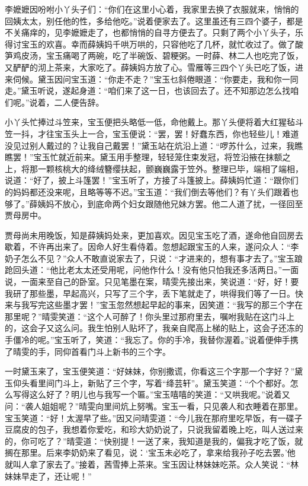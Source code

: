 \documentclass[12pt,oneside]{book}
\begin{document}
李嬷嬷因吩咐小丫头子们：“你们在这里小心着，我家里去换了衣服就来，悄悄的回姨太太，别任他的性，多给他吃。”说着便家去了。这里虽还有三四个婆子，都是不关痛痒的，见李嬷嬷走了，也都悄悄的自寻方便去了。只剩了两个小丫头子，乐得讨宝玉的欢喜。幸而薛姨妈千哄万哄的，只容他吃了几杯，就忙收过了。做了酸笋鸡皮汤，宝玉痛喝了两碗，吃了半碗饭、碧粳粥。一时薛、林二人也吃完了饭，又酽酽的沏上茶来，大家吃了。薛姨妈方放了心。雪雁等三四个丫头已吃了饭，进来伺候。黛玉因问宝玉道：“你走不走？”宝玉乜斜倦眼道：“你要走，我和你一同走。”黛玉听说，遂起身道：“咱们来了这一日，也该回去了。还不知那边怎么找咱们呢。”说着，二人便告辞。

小丫头忙捧过斗笠来，宝玉便把头略低一低，命他戴上。那丫头便将着大红猩毡斗笠一抖，才往宝玉头上一合，宝玉便说：“罢，罢！好蠢东西，你也轻些儿！难道没见过别人戴过的？让我自己戴罢！”黛玉站在炕沿上道：“啰苏什么，过来，我瞧瞧罢！”宝玉忙就近前来。黛玉用手整理，轻轻笼住束发冠，将笠沿掖在抹额之上，将那一颗核桃大的绛绒簪缨扶起，颤巍巍露于笠外。整理已毕，端相了端相，说道：“好了，披上斗篷罢！”宝玉听了，方接了斗篷披上。薛姨妈忙道：“跟你们的妈妈都还没来呢，且略等等不迟。”宝玉道：“我们倒去等他们？有丫头们跟着也够了。”薛姨妈不放心，到底命两个妇女跟随他兄妹方罢。他二人道了扰，一径回至贾母房中。

贾母尚未用晚饭，知是薛姨妈处来，更加喜欢。因见宝玉吃了酒，遂命他自回房去歇着，不许再出来了。因命人好生看侍着。忽想起跟宝玉的人来，遂问众人：“李奶子怎么不见？”众人不敢直说家去了，只说：“才进来的，想有事才去了。”宝玉踉跄回头道：“他比老太太还受用呢，问他作什么！没有他只怕我还多活两日。”一面说，一面来至自己的卧室。只见笔墨在案，晴雯先接出来，笑说道：“好，好！要我研了那些墨，早起高兴，只写了三个字，丢下笔就走了，哄得我们等了一日。快来与我写完这些墨才罢！”宝玉忽然想起早起的事来，因笑道：“我写的那三个字在那里呢？”晴雯笑道：“这个人可醉了！你头里过那府里去，嘱咐我贴在这门斗上的，这会子又这么问。我生怕别人贴坏了，我亲自爬高上梯的贴上，这会子还冻的手僵冷的呢。”宝玉听了，笑道：“我忘了。你的手冷，我替你渥着。”说着便伸手携了晴雯的手，同仰首看门斗上新书的三个字。

一时黛玉来了，宝玉便笑道：“好妹妹，你别撒谎，你看这三个字那一个字好？”黛玉仰头看里间门斗上，新贴了三个字，写着“绛芸轩”。黛玉笑道：“个个都好。怎么写得这么好了？明儿也与我写一个匾。”宝玉嘻嘻的笑道：“又哄我呢。”说着又问：“袭人姐姐呢？”晴雯向里间炕上努嘴。宝玉一看，只见袭人和衣睡着在那里。宝玉笑道：“好！太渥早了些。”因又问晴雯道：“今儿我在那府里吃早饭，有一碟子豆腐皮的包子，我想着你爱吃，和珍大奶奶说了，只说我留着晚上吃，叫人送过来的，你可吃了？”晴雯道：“快别提！一送了来，我知道是我的，偏我才吃了饭，就搁在那里。后来李奶奶来了看见，说：‘宝玉未必吃了，拿来给我孙子吃去罢。’他就叫人拿了家去了。”接着，茜雪捧上茶来。宝玉因让林妹妹吃茶。众人笑说：“林妹妹早走了，还让呢！”
\end{document}
